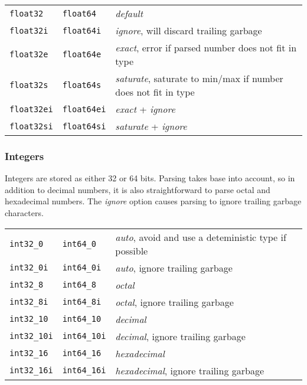 \begin{tabular}{p{2cm}p{2cm}l}
\texttt{float32} & \texttt{float64} & \emph{default}\\
\texttt{float32i} & \texttt{float64i} & \emph{ignore}, will discard trailing garbage\\
\texttt{float32e} & \texttt{float64e} & \emph{exact}, error if parsed number does not fit in type \\
\texttt{float32s} & \texttt{float64s} & \emph{saturate}, saturate to min/max if number does not fit in type \\
\texttt{float32ei} & \texttt{float64ei} & \emph{exact} + \emph{ignore} \\
\texttt{float32si} & \texttt{float64si} & \emph{saturate} + \emph{ignore} \\
\end{tabular}

\subsubsection{Integers}
Integers are stored as either 32 or 64 bits.  Parsing takes base into
account, so in addition to decimal numbers, it is also straightforward
to parse octal and hexadecimal numbers.  The \emph{ignore} option
causes parsing to ignore trailing garbage characters.\\

\begin{tabular}{p{2cm}p{2cm}l}
  \texttt{int32\_0}   & \texttt{int64\_0}   & \emph{auto}, avoid and use a deteministic type if possible \\
  \texttt{int32\_0i}  & \texttt{int64\_0i}  & \emph{auto}, ignore trailing garbage \\
  \texttt{int32\_8}   & \texttt{int64\_8}   & \emph{octal} \\
  \texttt{int32\_8i}  & \texttt{int64\_8i}  & \emph{octal}, ignore trailing garbage \\
  \texttt{int32\_10}  & \texttt{int64\_10}  & \emph{decimal} \\
  \texttt{int32\_10i} & \texttt{int64\_10i} & \emph{decimal}, ignore trailing garbage \\
  \texttt{int32\_16}  & \texttt{int64\_16}  & \emph{hexadecimal} \\
  \texttt{int32\_16i} & \texttt{int64\_16i} & \emph{hexadecimal}, ignore trailing garbage \\
\end{tabular}



